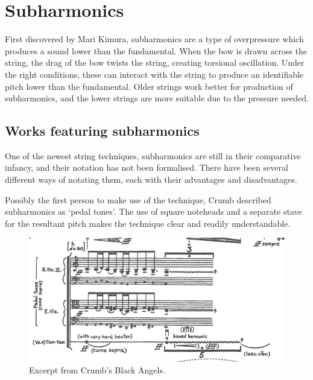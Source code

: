 \section{Subharmonics}
First discovered by Mari Kimura, subharmonics are a type of overpressure which produces a sound lower than the fundamental.\autocite{kimuraHowProduceSubharmonics1999}  When the bow is drawn across the string, the drag of the bow twists the string, creating torsional oscillation. Under the right conditions, these can interact with the string to produce an identifiable pitch lower than the fundamental.\autocite{Subharmonics2006} Older strings work better for production of subharmonics, and the lower strings are more suitable due to the pressure needed.\autocite{kimuraHowProduceSubharmonics1999}


\subsection{Works featuring subharmonics}
One of the newest string techniques, subharmonics are still in their comparative infancy, and their notation has not been formalised. There have been several different ways of notating them, each with their advantages and disadvantages.



Possibly the first person to make use of the technique, Crumb described subharmonics as `pedal tones'.\autocite{crumbBlackAngelsImages1971} The use of square noteheads and a separate stave for the resultant pitch makes the technique clear and readily understandable.
\begin{figure}
    \includegraphics[width=\linewidth]{./resources/crumbBlackAngels.png}
    \caption{Excerpt from Crumb's Black Angels.}
\label{fig:Excerpt from Crumb's Black Angels}
  \end{figure}

